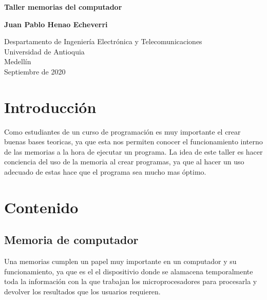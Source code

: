 \documentclass{article}
\begin{document}
\begin{titlepage}
    \begin{center}
        \vspace*{1cm}
            
        \Huge
        \textbf{Taller memorias del computador}
            
        \vspace{0.5cm}
        \LARGE
        
            
        \vspace{1.5cm}
            
        \textbf{Juan Pablo Henao Echeverri}
            
        \vfill
            
        \vspace{0.8cm}
            
        \Large
        Despartamento de Ingeniería Electrónica y Telecomunicaciones\\
        Universidad de Antioquia\\
        Medellín\\
        Septiembre de 2020
            
    \end{center}
\end{titlepage}

\tableofcontents

\section{Introducción}
Como estudiantes de un curso de programación es muy importante el crear buenas bases teoricas, ya que esta nos permiten conocer el funcionamiento interno de las memorias a la hora de ejecutar un programa. La idea de este taller es hacer conciencia del uso de la memoria al crear programas, ya que al hacer un uso adecuado de estas hace que el programa sea mucho mas óptimo. 

\section{Contenido} \label{contenido}

\subsection{Memoria de computador}

Una memorias cumplen un papel muy importante en un computador y su funcionamiento, ya que es el el dispositivio donde se alamacena temporalmente toda la información con la que trabajan los microprocesadores para procesarla y devolver los resultados que los usuarios requieren. \cite{taller} \\
\end{document}
